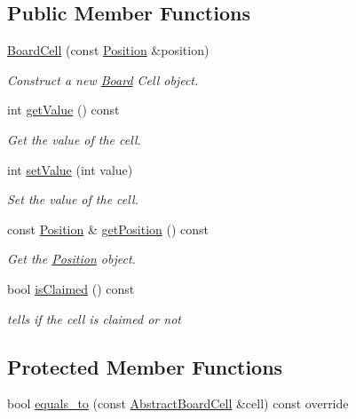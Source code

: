 \subsection*{Public Member Functions}
\begin{DoxyCompactItemize}
\item 
\hyperlink{classgame_1_1tic__tac__toe_1_1_board_cell_abef7037c86f1ca3bcac123fc9383ae90}{Board\+Cell} (const \hyperlink{structgame_1_1_position}{Position} \&position)
\begin{DoxyCompactList}\small\item\em Construct a new \hyperlink{classgame_1_1tic__tac__toe_1_1_board}{Board} Cell object. \end{DoxyCompactList}\item 
int \hyperlink{classgame_1_1tic__tac__toe_1_1_board_cell_a14b1c802c346bbeec7263b77ea6266c8}{get\+Value} () const
\begin{DoxyCompactList}\small\item\em Get the value of the cell. \end{DoxyCompactList}\item 
int \hyperlink{classgame_1_1tic__tac__toe_1_1_board_cell_a3ee72b5b70a0d0eb8abbe4cdcdf4038d}{set\+Value} (int value)
\begin{DoxyCompactList}\small\item\em Set the value of the cell. \end{DoxyCompactList}\item 
const \hyperlink{structgame_1_1_position}{Position} \& \hyperlink{classgame_1_1tic__tac__toe_1_1_board_cell_aa418994b5cdf5c74b105701193d72a1b}{get\+Position} () const
\begin{DoxyCompactList}\small\item\em Get the \hyperlink{structgame_1_1_position}{Position} object. \end{DoxyCompactList}\item 
bool \hyperlink{classgame_1_1tic__tac__toe_1_1_board_cell_a800b9a8409ad28086ad1e7cb275fa25e}{is\+Claimed} () const
\begin{DoxyCompactList}\small\item\em tells if the cell is claimed or not \end{DoxyCompactList}\end{DoxyCompactItemize}
\subsection*{Protected Member Functions}
\begin{DoxyCompactItemize}
\item 
bool \hyperlink{classgame_1_1tic__tac__toe_1_1_board_cell_a909bb91d32553cebbe9749bd6814b8f4}{equals\+\_\+to} (const \hyperlink{classgame_1_1_abstract_board_cell}{Abstract\+Board\+Cell} \&cell) const override
\end{DoxyCompactItemize}


